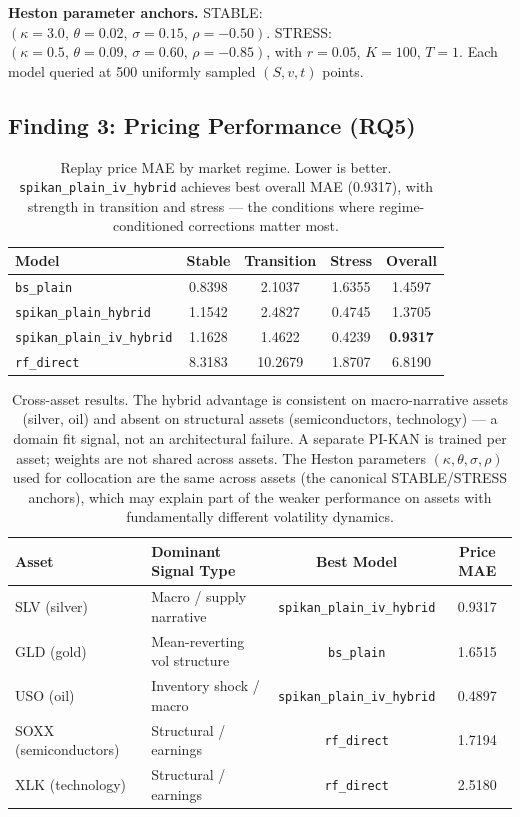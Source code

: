 \documentclass[11pt,a4paper]{article}
\begin{document}
\textbf{Heston parameter anchors.} STABLE: $(\kappa{=}3.0,\,\theta{=}0.02,\,\sigma{=}0.15,\,\rho{=}{-}0.50)$.
STRESS: $(\kappa{=}0.5,\,\theta{=}0.09,\,\sigma{=}0.60,\,\rho{=}{-}0.85)$, with
$r{=}0.05$, $K{=}100$, $T{=}1$. Each model queried at 500 uniformly sampled
$(S,v,t)$ points.

\subsection{Finding 3: Pricing Performance (RQ5)}
\label{sec:experiments:pricing}

\begin{table}[ht]
\centering
\caption{Replay price MAE by market regime. Lower is better.
\texttt{spikan\_plain\_iv\_hybrid} achieves best overall MAE (0.9317), with strength
in transition and stress --- the conditions where regime-conditioned corrections
matter most.}
\begin{tabular}{@{}lcccc@{}}
\toprule
Model & Stable & Transition & Stress & Overall \\ \midrule
\texttt{bs\_plain} & 0.8398 & 2.1037 & 1.6355 & 1.4597 \\
\texttt{spikan\_plain\_hybrid} & 1.1542 & 2.4827 & 0.4745 & 1.3705 \\
\texttt{spikan\_plain\_iv\_hybrid} & 1.1628 & 1.4622 & 0.4239 & \textbf{0.9317} \\
\texttt{rf\_direct} & 8.3183 & 10.2679 & 1.8707 & 6.8190 \\
\bottomrule
\end{tabular}
\label{tab:replay}
\end{table}

\begin{table}[ht]
\centering
\caption{Cross-asset results. The hybrid advantage is consistent on macro-narrative
assets (silver, oil) and absent on structural assets (semiconductors, technology) ---
a domain fit signal, not an architectural failure. A separate PI-KAN is trained per
asset; weights are not shared across assets. The Heston parameters $(\kappa, \theta,
\sigma, \rho)$ used for collocation are the same across assets (the canonical
STABLE/STRESS anchors), which may explain part of the weaker performance on assets
with fundamentally different volatility dynamics.}
\begin{tabular}{@{}llcc@{}}
\toprule
Asset & Dominant Signal Type & Best Model & Price MAE \\ \midrule
SLV (silver) & Macro / supply narrative & \texttt{spikan\_plain\_iv\_hybrid} & 0.9317 \\
GLD (gold) & Mean-reverting vol structure & \texttt{bs\_plain} & 1.6515 \\
USO (oil) & Inventory shock / macro & \texttt{spikan\_plain\_iv\_hybrid} & 0.4897 \\
SOXX (semiconductors) & Structural / earnings & \texttt{rf\_direct} & 1.7194 \\
XLK (technology) & Structural / earnings & \texttt{rf\_direct} & 2.5180 \\
\bottomrule
\end{tabular}
\label{tab:cross_asset}
\end{table}
\end{document}
